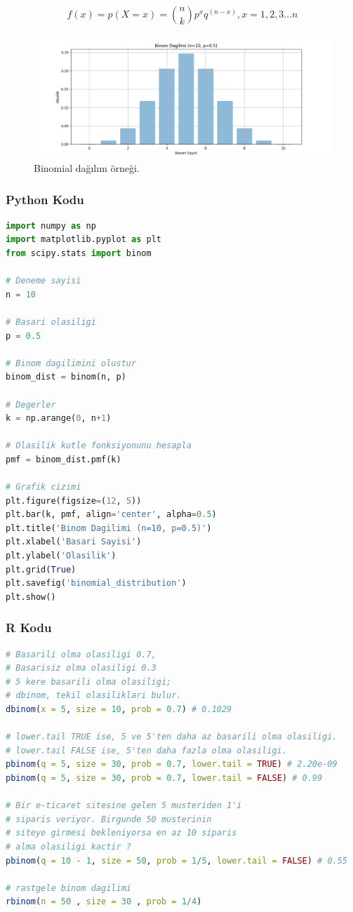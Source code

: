 \[
f(x) = p(X = x) = \binom{n}{k} p^x q^(n - x), x = 1,2,3...n
\]

\begin{figure}[h]
    \centering
    \includegraphics[width=1\textwidth]{images/binomial_distribution.png}
    \caption{Binomial dağılım örneği.}
    \label{fig:enter-label}
\end{figure}

\subsubsection{Python Kodu}

\begin{lstlisting}[language=Python]
import numpy as np
import matplotlib.pyplot as plt
from scipy.stats import binom

# Deneme sayisi
n = 10

# Basari olasiligi
p = 0.5

# Binom dagilimini olustur
binom_dist = binom(n, p)

# Degerler
k = np.arange(0, n+1)

# Olasilik kutle fonksiyonunu hesapla
pmf = binom_dist.pmf(k)

# Grafik cizimi
plt.figure(figsize=(12, 5))
plt.bar(k, pmf, align='center', alpha=0.5)
plt.title('Binom Dagilimi (n=10, p=0.5)')
plt.xlabel('Basari Sayisi')
plt.ylabel('Olasilik')
plt.grid(True)
plt.savefig('binomial_distribution')
plt.show()
\end{lstlisting}

\subsubsection{R Kodu}

\begin{lstlisting}[language=R]
# Basarili olma olasiligi 0.7,
# Basarisiz olma olasiligi 0.3
# 5 kere basarili olma olasiligi;
# dbinom, tekil olasiliklari bulur.
dbinom(x = 5, size = 10, prob = 0.7) # 0.1029

# lower.tail TRUE ise, 5 ve 5'ten daha az basarili olma olasiligi.
# lower.tail FALSE ise, 5'ten daha fazla olma olasiligi.
pbinom(q = 5, size = 30, prob = 0.7, lower.tail = TRUE) # 2.20e-09
pbinom(q = 5, size = 30, prob = 0.7, lower.tail = FALSE) # 0.99

# Bir e-ticaret sitesine gelen 5 musteriden 1'i
# siparis veriyor. Birgunde 50 musterinin
# siteye girmesi bekleniyorsa en az 10 siparis
# alma olasiligi kactir ?
pbinom(q = 10 - 1, size = 50, prob = 1/5, lower.tail = FALSE) # 0.55

# rastgele binom dagilimi
rbinom(n = 50 , size = 30 , prob = 1/4)
\end{lstlisting}

